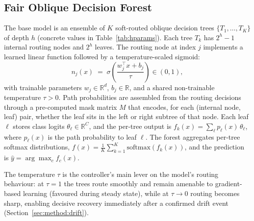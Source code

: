 \documentclass[sigconf,anonymous,review]{acmart}
\begin{document}
\subsection{Fair Oblique Decision Forest}
\label{sec:method:model}
The base model is an ensemble of $K$ soft-routed oblique decision trees $\{T_1, \ldots, T_K\}$ of depth $h$ (concrete values in Table~\ref{tab:hparams}). Each tree
$T_k$ has $2^{h}-1$ internal routing nodes and $2^{h}$ leaves. The routing node at index $j$ implements a learned linear function followed by a temperature-scaled sigmoid:
\[
n_j(x) \;=\; \sigma\!\left(\frac{w_j^{\top} x + b_j}{\tau}\right) \in (0,1),
\]
with trainable parameters $w_j \in \mathbb{R}^d$, $b_j \in \mathbb{R}$, and a shared non-trainable temperature $\tau > 0$. Path probabilities are
assembled from the routing decisions through a pre-computed mask matrix $M$ that encodes, for each (internal node, leaf) pair, whether the leaf
sits in the left or right subtree of that node. Each leaf $\ell$ stores class logits $\theta_\ell \in \mathbb{R}^{C}$,
and the per-tree output is $f_k(x) = \sum_\ell p_\ell(x)\,\theta_\ell$, where $p_\ell(x)$ is the path probability to leaf $\ell$. The forest aggregates per-tree
softmax distributions, $f(x) = \tfrac{1}{K}\sum_{k=1}^{K} \mathrm{softmax}(f_k(x))$, and the prediction is $\hat{y} = \arg\max_c f_c(x)$.

The temperature $\tau$ is the controller's main lever on the model's routing behaviour: at $\tau = 1$ the trees route smoothly and remain
amenable to gradient-based learning (favoured during steady state), while at $\tau \to 0$ routing becomes sharp, enabling decisive recovery
immediately after a confirmed drift event (Section~\ref{sec:method:drift}).
\end{document}
